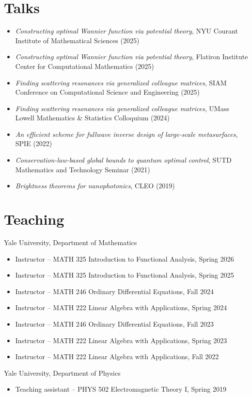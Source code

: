\documentclass[margin,line,pifont,palatino,courier]{res}
\begin{document}
\begin{resume}
\section{\sc Talks}
\begin{itemize}
		\item \emph{Constructing optimal Wannier function via potential theory}, NYU Courant Institute of Mathematical Sciences (2025)
		\item \emph{Constructing optimal Wannier function via potential theory}, Flatiron Institute  Center for Computational Mathematics (2025)
	\item \emph{Finding scattering resonances via generalized colleague matrices}, SIAM Conference on Computational Science and Engineering (2025)
	\item \emph{Finding scattering resonances via generalized colleague matrices}, UMass Lowell Mathematics \& Statistics Colloquium (2024)
	\item \emph{An efficient scheme for fullwave inverse design of large-scale metasurfaces}, SPIE (2022)
	\item \emph{Conservation-law-based global bounds to quantum optimal control}, SUTD Mathematics and Technology Seminar (2021)
	\item \emph{Brightness theorems for nanophotonics}, CLEO (2019)
\end{itemize}

\section{\sc Teaching}
Yale University, Department of Mathematics

\begin{itemize}
\setlength\itemsep{0em}
	\item Instructor -- MATH 325 Introduction to Functional Analysis, Spring 2026
	\item Instructor -- MATH 325 Introduction to Functional Analysis, Spring 2025
	\item Instructor -- MATH 246 Ordinary Differential Equations, Fall 2024
		\item Instructor -- MATH 222 Linear Algebra with Applications, Spring 2024
	\item Instructor -- MATH 246 Ordinary Differential Equations, Fall 2023
	\item Instructor -- MATH 222 Linear Algebra with Applications, Spring 2023
	\item Instructor -- MATH 222 Linear Algebra with Applications, Fall 2022

\end{itemize}
Yale University, Department of Physics

\begin{itemize}
\setlength\itemsep{0em}
	\item Teaching assistant -- PHYS 502 Electromagnetic Theory I, Spring 2019
\end{itemize}




\end{resume}
\end{document}
